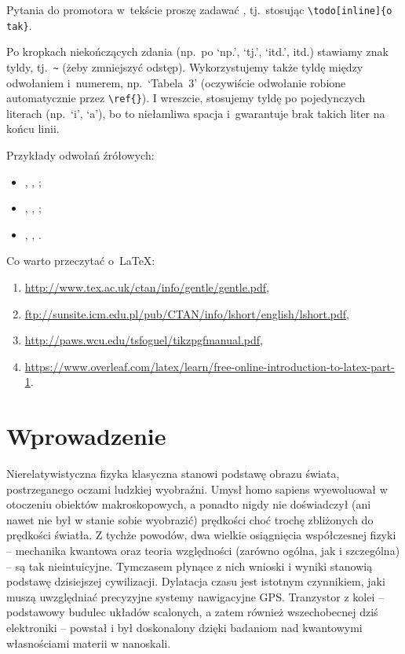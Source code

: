 \documentclass[12pt,a4paper,twoside,openany]{book}
\begin{document}
Pytania do promotora w~tekście proszę zadawać , tj.~stosując \verb!\todo[inline]{o tak}!.

Po kropkach niekończących zdania (np.~po `np.', `tj.', `itd.', itd.) stawiamy znak tyldy, tj.~\verb!~! (żeby zmniejszyć odstęp). Wykorzystujemy także tyldę między odwołaniem i~numerem, np.~`Tabela~3' (oczywiście odwołanie robione automatycznie przez \verb!\ref{}!). I wreszcie, stosujemy tyldę po pojedynczych literach (np.~`i', `a'), bo to niełamliwa spacja i~gwarantuje brak takich liter na końcu linii.

Przykłady odwołań źrółowych:
\begin{itemize}
\item \citep{dolan2000}, \citet{dolan2000}, ;
\item \citep{wakker1999}, \citet{wakker1999}, ;
\item \citep{drummond1997}, \citet{drummond1997}, .
\end{itemize}

Co warto przeczytać o~\LaTeX:
\begin{enumerate}
\footnotesize %
\item \url{http://www.tex.ac.uk/ctan/info/gentle/gentle.pdf},
\item \url{ftp://sunsite.icm.edu.pl/pub/CTAN/info/lshort/english/lshort.pdf},
\item \url{http://paws.wcu.edu/tsfoguel/tikzpgfmanual.pdf},
\item \url{https://www.overleaf.com/latex/learn/free-online-introduction-to-latex-part-1}.
\end{enumerate}

\chapter{Wprowadzenie}

Nierelatywistyczna fizyka klasyczna stanowi podstawę obrazu świata, postrzeganego oczami ludzkiej wyobraźni. Umysł homo sapiens wyewoluował w otoczeniu obiektów makroskopowych, a ponadto nigdy nie doświadczył (ani nawet nie był w stanie sobie wyobrazić) prędkości choć trochę zbliżonych do prędkości światła. Z tychże powodów, dwa wielkie osiągnięcia współczesnej fizyki – mechanika kwantowa oraz teoria względności (zarówno ogólna, jak i szczególna) – są tak nieintuicyjne. Tymczasem płynące z nich wnioski i wyniki stanowią podstawę dzisiejszej cywilizacji. Dylatacja czasu jest istotnym czynnikiem, jaki muszą uwzględniać precyzyjne systemy nawigacyjne GPS. Tranzystor z kolei – podstawowy budulec układów scalonych, a zatem również wszechobecnej dziś elektroniki – powstał i był doskonalony dzięki badaniom nad kwantowymi własnościami materii w nanoskali.
\end{document}
